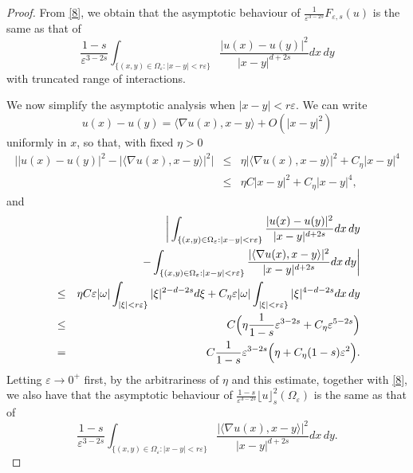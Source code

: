 \documentclass[11pt]{article}
\def\e{\varepsilon}
\begin{document}
\begin{proof}
From \eqref{8}, we obtain that the asymptotic behaviour of $\frac{1}{\e^{3-2s}}F_{\e,s}(u)$ is the same as that
of
$$
\frac{1-s}{\e^{3-2s}} \int_{\{(x,y)\in\Omega_\e: |x-y|<r\e\}}\frac{|u(x)-u(y)|^2}{|x-y|^{d+2s}} dx\,dy
$$
with truncated range of interactions.

We now simplify the asymptotic analysis when $|x-y|<r\e$. We can write
$$
u(x)-u(y)= \langle \nabla u(x), x-y\rangle + O(|x-y|^2)
$$
uniformly in $x$, so that, with fixed $\eta>0$
\begin{eqnarray*}
\big||u(x)-u(y)|^2- |\langle \nabla u(x), x-y\rangle|^2\big|
&\le& \eta|\langle \nabla u(x), x-y\rangle|^2 +C_\eta |x-y|^4\\
&\le& \eta C|x-y|^2 +C_\eta |x-y|^4,
\end{eqnarray*}
and
\begin{eqnarray}\label{a2}\nonumber
&&\hskip-1.5cm\bigg|\int_{\{(x,y)\in\Omega_\e: |x-y|<r\e\}}\frac{|u(x)-u(y)|^2}{|x-y|^{d+2s}} dx\,dy
\\ \nonumber
&& -\int_{\{(x,y)\in\Omega_\e: |x-y|<r\e\}}\frac{|\langle \nabla u(x), x-y\rangle|^2}{|x-y|^{d+2s}} dx\,dy\bigg|\\ \nonumber
&\le&  \eta C\e|\omega|\int_{|\xi|<r\e\}}{|\xi|^{2-d-2s}} d\xi+C_\eta \e|\omega|\int_{|\xi|<r\e\}}{|\xi|^{4-d-2s}} dx\,dy\\\nonumber
&\le&  C\Big( \eta \frac{1}{1-s}\e^{3-2s}+C_\eta \e^{5-2s}\Big)\\
&=&  C\frac{1}{1-s}\e^{3-2s}\Big(  \eta+ C_\eta (1-s)\e^2\Big).
\end{eqnarray}
Letting $\e\to 0^+$  first, by the arbitrariness of $\eta$ and this estimate, together with \eqref{8}, we also have that the asymptotic behaviour of $\frac{1-s}{\e^{3-2s}}\lfloor u\rfloor_s^2(\Omega_\e)$ is the same as that
of
$$
\frac{1-s}{\e^{3-2s}} \int_{\{(x,y)\in\Omega_\e: |x-y|<r\e\}}\frac{|\langle \nabla u(x), x-y\rangle|^2}{|x-y|^{d+2s}} dx\,dy.
$$


\end{proof}
\end{document}
